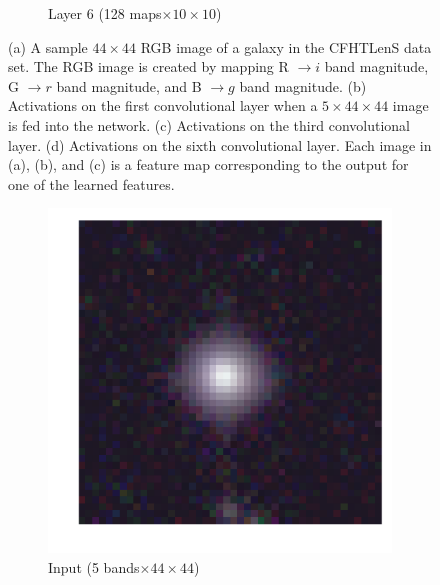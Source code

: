 \documentclass[fleqn,usenatbib]{mnras}
\begin{document}
\begin{figure}
\begin{subfigure}[c]{0.24\linewidth}
    \caption{Layer 6 (128 maps$\times10\times10$)}
  \end{subfigure}
  \caption{
    (a) A sample $44\times44$ RGB image of a galaxy in the CFHTLenS data set.
    The RGB image is created by mapping R $\rightarrow i$ band magnitude,
    G $\rightarrow r$ band magnitude, and B $\rightarrow g$ band magnitude.
    (b) Activations on the first convolutional layer when a $5\times44\times44$
    image is fed into the network.
    (c) Activations on the third convolutional layer.
    (d) Activations on the sixth convolutional layer.
    Each image in (a), (b), and (c) is a feature map corresponding to the
    output for one of the learned features.
    }
  \label{fig:galaxy_activations}
\end{figure}


\begin{figure}
  \centering
  \begin{subfigure}[c]{0.24\linewidth}
  \centering
    \includegraphics[width=\textwidth]{figures/star_original.pdf}
    \caption{Input (5 bands$\times44\times44$)}
  \end{subfigure}
  \hfill
  \begin{subfigure}[c]{0.24\linewidth}
  \centering

\end{subfigure}
\end{figure}
\end{document}
